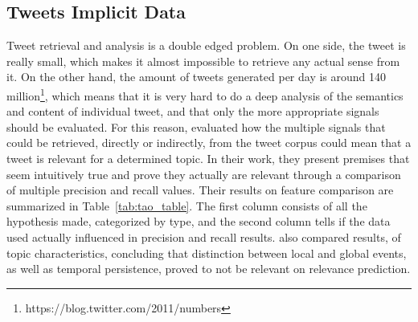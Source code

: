 \subsection{Tweets Implicit Data} 
\label{sub:the_tweet}
Tweet retrieval and analysis is a double edged problem. On one side, the tweet is really small, which makes it almost impossible to retrieve any actual sense from it. On the other hand, the amount of tweets generated per day is around 140 million\footnote{https://blog.twitter.com/2011/numbers}, which means that it is very hard to do a deep analysis of the semantics and content of individual tweet, and that only the more appropriate signals should be evaluated.
For this reason, \citet{Tao2012} evaluated how the multiple signals that could be retrieved, directly or indirectly, from the tweet corpus could mean that a tweet is relevant for a determined topic. In their work, they present premises that seem intuitively true and prove they actually are relevant through a comparison of multiple precision and recall values. Their results on feature comparison are summarized in Table~\ref{tab:tao_table}. The first column consists of all the hypothesis made, categorized by type, and the second column tells if the data used actually influenced in precision and recall results. \citet{Tao2012} also compared results, of topic characteristics, concluding that distinction between local and global events, as well as temporal persistence, proved to not be relevant on relevance prediction.


